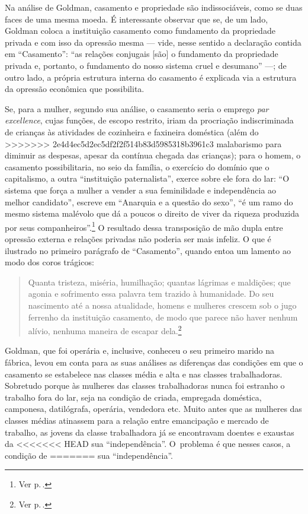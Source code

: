 Na análise de Goldman, casamento e propriedade são indissociáveis, como
se duas faces de uma mesma moeda. É interessante observar que se,
de um lado, Goldman coloca a instituição casamento como
fundamento da propriedade privada e com isso da opressão mesma --- vide,
nesse sentido a declaração contida em ``Casamento'': ``as relações
conjugais {[}são{]} o fundamento da propriedade privada e, portanto, o
fundamento do nosso sistema cruel e desumano'' ---; de outro lado,
a própria estrutura interna do casamento é explicada via a estrutura da
opressão econômica que possibilita. 

Se, para a mulher, segundo sua
análise, o casamento seria o emprego \textit{par excellence}, cujas
funções, de escopo restrito, iriam da procriação indiscriminada de
crianças às atividades de cozinheira e faxineira doméstica (além do
>>>>>>> 2e4d4ec5d2ec5df2f2f514b83d5985318b3961c3
malabarismo para diminuir as despesas, apesar da contínua chegada das
crianças); para o homem, o casamento possibilitaria, no seio da família,
o exercício do domínio que o capitalismo, a outra ``instituição
paternalista'', exerce sobre ele fora do lar: ``O sistema que
força a mulher a vender a sua feminilidade e independência ao melhor
candidato'', escreve em ``Anarquia e a questão do sexo'', ``é um ramo do
mesmo sistema malévolo que dá a poucos o direito de viver da riqueza
produzida por seus companheiros''.\footnote{Ver p.\,\pageref{sistema}.} O resultado dessa transposição de mão
dupla entre opressão externa e relações privadas não poderia ser mais
infeliz. O que é ilustrado no primeiro parágrafo de ``Casamento'',
quando entoa um lamento ao modo dos coros trágicos:

\begin{quote}
Quanta tristeza, miséria, humilhação; quantas lágrimas e maldições; que
agonia e sofrimento essa palavra tem trazido à humanidade. Do seu
nascimento até a nossa atualidade, homens e mulheres crescem sob o jugo
ferrenho da instituição casamento, de modo que parece não haver nenhum
alívio, nenhuma maneira de escapar dela.\footnote{Ver p.\,\pageref{casamento}.}
\end{quote}

Goldman, que foi operária e, inclusive, conheceu o seu primeiro
marido na fábrica, levou em conta para as 
suas análises as diferenças das condições em que o casamento se
estabelece nas classes média e alta e nas classes
trabalhadoras. Sobretudo porque às mulheres das classes
trabalhadoras nunca foi estranho o trabalho fora do lar, seja na
condição de criada, empregada doméstica, camponesa, datilógrafa,
operária, vendedora etc. Muito antes que as mulheres das classes médias
atinassem para a relação entre emancipação e mercado de trabalho, as
jovens da classe trabalhadora já se encontravam doentes e exaustas da
<<<<<<< HEAD
sua ``independência''. O~problema é que nesses casos, a condição de
=======
sua ``independência''. 

